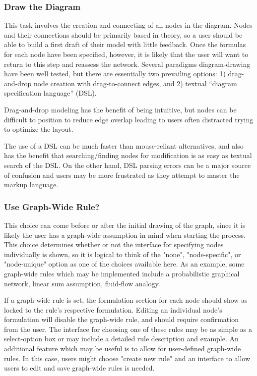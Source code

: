 \documentclass[conference]{IEEEtran}
\begin{document}
\subsubsection{Draw the Diagram}
This task involves the creation and connecting of all nodes in the diagram. 
Nodes and their connections should be primarily based in theory, so a user should be able to build a first draft of their model with little feedback. 
Once the formulas for each node have been specified, however, it is likely that the user will want to return to this step and reassess the network. 
Several paradigms diagram-drawing have been well tested, but there are essentially two prevailing options:
1) drag-and-drop node creation with drag-to-connect edges, and 2) textual ``diagram specification language'' (DSL).

Drag-and-drop modeling has the benefit of being intuitive, but nodes can be difficult to position to reduce edge overlap leading to users often distracted trying to optimize the layout.

The use of a DSL can be much faster than mouse-reliant alternatives, and also has the benefit that searching/finding nodes for modification is as easy as textual search of the DSL.
On the other hand, DSL parsing errors can be a major source of confusion and users may be more frustrated as they attempt to master the markup language.


\subsubsection{Use Graph-Wide Rule?}
This choice can come before or after the initial drawing of the graph, since it is likely the user has a graph-wide assumption in mind when starting the process. 
This choice determines whether or not the interface for specifying nodes individually is shown, so it is logical to think of the "none", "node-specific", or "node-unique" option as one of the choices available here. 
As an example, some graph-wide rules which may be implemented include a probabilistic graphical network, linear sum assumption, fluid-flow analogy.

If a graph-wide rule is set, the formulation section for each node should show as locked to the rule's respective formulation. 
Editing an individual node's formulation will disable the graph-wide rule, and should require confirmation from the user. 
The interface for choosing one of these rules may be as simple as a select-option box or may include a detailed rule description and example. 
An additional feature which may be useful is to allow for user-defined graph-wide rules. 
In this case, users might choose "create new rule" and an interface to allow users to edit and save graph-wide rules is needed.
\end{document}
